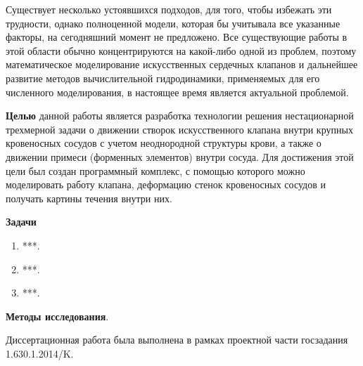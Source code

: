 
Существует несколько устоявшихся подходов, для того, чтобы избежать эти
трудности, однако полноценной модели, которая бы учитывала все указанные
факторы, на сегодняшний момент не предложено. Все существующие работы в этой
области обычно концентрируются на какой-либо одной из проблем, поэтому
математическое моделирование искусственных сердечных клапанов и дальнейшее развитие 
методов вычислительной гидродинамики, применяемых для его численного моделирования,
в настоящее время является актуальной проблемой.

\textbf{Целью} данной работы является разработка технологии решения
нестационарной трехмерной задачи о движении створок искусственного клапана
внутри крупных кровеносных сосудов с учетом неоднородной структуры крови, а
также о движении примеси (форменных элементов) внутри сосуда. Для достижения
этой цели был создан программный комплекс, с помощью которого можно
моделировать работу клапана, деформацию стенок кровеносных сосудов и получать
картины течения внутри них.

\textbf{Задачи}
\begin{enumerate}
 \item ***.
 \item ***.
 \item ***.
\end{enumerate}

\textbf{Методы исследования}.

Диссертационная работа была выполнена в рамках проектной части госзадания
1.630.1.2014/K.

